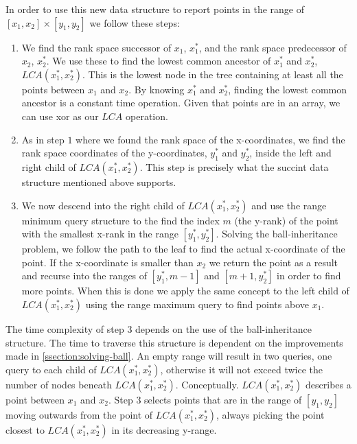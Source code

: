 In order to use this new data structure to report points in the range of $[x_1, x_2] \times [y_1, y_2]$ we follow these steps:
\begin{enumerate}
  \item We find the rank space successor of $x_1$, $x^*_1$, and the rank space predecessor of $x_2$, $x^*_2$. We use these to find the lowest common ancestor of $x^*_1$ and $x^*_2$, $LCA(x^*_1, x^*_2)$. This is the lowest node in the tree containing at least all the points between $x_1$ and $x_2$. By knowing $x^*_1$ and $x^*_2$, finding the lowest common ancestor is a constant time operation. Given that points are in an array, we can use xor as our $LCA$ operation. 
  \item As in step $1$ where we found the rank space of the x-coordinates, we find the rank space coordinates of the y-coordinates, $y^*_1$ and $y^*_2$, inside the left and right child of $LCA(x^*_1, x^*_2)$. This step is precisely what the succint data structure mentioned above supports.
  \item We now descend into the right child of $LCA(x^*_1, x^*_2)$ and use the range minimum query structure to the find the index $m$ (the y-rank) of the point with the smallest x-rank in the range $[y^*_1, y^*_2]$. Solving the ball-inheritance problem, we follow the path to the leaf to find the actual x-coordinate of the point. If the x-coordinate is smaller than $x_2$ we return the point as a result and recurse into the ranges of $[y^*_1, m-1]$ and $[m+1, y^*_2]$ in order to find more points. When this is done we apply the same concept to the left child of $LCA(x^*_1, x^*_2)$ using the range maximum query to find points above $x_1$.
\end{enumerate}


The time complexity of step $3$ depends on the use of the ball-inheritance structure. The time to traverse this structure is dependent on the improvements made in \ref{ssection:solving-ball}. An empty range will result in two queries, one query to each child of $LCA(x^*_1, x^*_2)$, otherwise it will not exceed twice the number of nodes beneath $LCA(x^*_1, x^*_2)$.  Conceptually. $LCA(x^*_1, x^*_2)$ describes a point between $x_1$ and $x_2$. Step $3$ selects points that are in the range of $[y_1, y_2]$ moving outwards from the point of $LCA(x^*_1, x^*_2)$, always picking the point closest to $LCA(x^*_1, x^*_2)$ in its decreasing y-range. 

